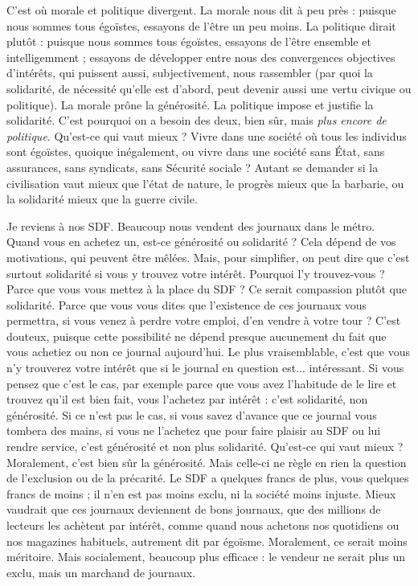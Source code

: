 C’est où morale et politique divergent. La morale nous dit à peu près :
puisque nous sommes tous égoïstes, essayons de l’être un peu moins. La politique
dirait plutôt : puisque nous sommes tous égoïstes, essayons de l’être
ensemble et intelligemment ; essayons de développer entre nous des convergences
objectives d'intérêts, qui puissent aussi, subjectivement, nous rassembler
(par quoi la solidarité, de nécessité qu’elle est d’abord, peut devenir aussi une
vertu civique ou politique). La morale prône la générosité. La politique impose
et justifie la solidarité. C’est pourquoi on a besoin des deux, bien sûr, mais {\it plus
encore de politique}. Qu'est-ce qui vaut mieux ? Vivre dans une société où tous
les individus sont égoïstes, quoique inégalement, ou vivre dans une société sans
État, sans assurances, sans syndicats, sans Sécurité sociale ? Autant se demander
si la civilisation vaut mieux que l’état de nature, le progrès mieux que la barbarie,
ou la solidarité mieux que la guerre civile.

Je reviens à nos SDF. Beaucoup nous vendent des journaux dans le métro.
Quand vous en achetez un, est-ce générosité ou solidarité ? Cela dépend de vos
motivations, qui peuvent être mêlées. Mais, pour simplifier, on peut dire que
c’est surtout solidarité si vous y trouvez votre intérêt. Pourquoi l'y trouvez-vous ?
Parce que vous vous mettez à la place du SDF ? Ce serait compassion
plutôt que solidarité. Parce que vous vous dites que l’existence de ces journaux
vous permettra, si vous venez à perdre votre emploi, d’en vendre à votre tour ?
C’est douteux, puisque cette possibilité ne dépend presque aucunement du fait
que vous achetiez ou non ce journal aujourd’hui. Le plus vraisemblable, c’est
que vous n’y trouverez votre intérêt que si le journal en question est... intéressant.
Si vous pensez que c’est le cas, par exemple parce que vous avez l’habitude
de le lire et trouvez qu’il est bien fait, vous l’achetez par intérêt : c’est solidarité,
non générosité. Si ce n’est pas le cas, si vous savez d’avance que ce journal vous
tombera des mains, si vous ne l’achetez que pour faire plaisir au SDF ou lui
rendre service, c’est générosité et non plus solidarité. Qu'est-ce qui vaut
mieux ? Moralement, c’est bien sûr la générosité. Mais celle-ci ne règle en rien
la question de l’exclusion ou de la précarité. Le SDF a quelques francs de plus,
vous quelques francs de moins ; il n’en est pas moins exclu, ni la société moins
injuste. Mieux vaudrait que ces journaux deviennent de bons journaux, que des
millions de lecteurs les achètent par intérêt, comme quand nous achetons nos
quotidiens ou nos magazines habituels, autrement dit par égoïsme. Moralement,
ce serait moins méritoire. Mais socialement, beaucoup plus efficace : le
vendeur ne serait plus un exclu, mais un marchand de journaux.

